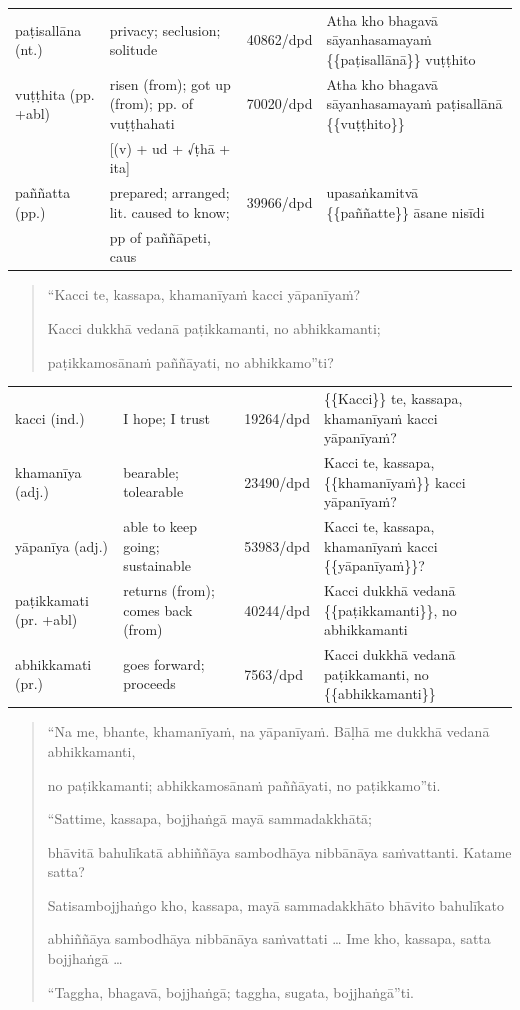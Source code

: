 \documentclass[11pt,oneside]{memoir}
\begin{document}
\begin{longtable}{L{\colOne} L{\colTwo} H H}
paṭisallāna (nt.) & privacy; seclusion; solitude & 40862/dpd & Atha kho bhagavā sāyanhasamayaṁ \{\{paṭisallānā\}\} vuṭṭhito\\[0pt]
vuṭṭhita (pp. +abl) & risen (from); got up (from); pp. of vuṭṭhahati & 70020/dpd & Atha kho bhagavā sāyanhasamayaṁ paṭisallānā \{\{vuṭṭhito\}\}\\[0pt]
 & [(v) + ud + √ṭhā + ita] &  & \\[0pt]
paññatta (pp.) & prepared; arranged; lit. caused to know; & 39966/dpd & upasaṅkamitvā \{\{paññatte\}\} āsane nisīdi\\[0pt]
 & pp of paññāpeti, caus &  & \\[0pt]
\end{longtable}

\begin{quote}
“Kacci te, kassapa, khamanīyaṁ kacci yāpanīyaṁ?

Kacci dukkhā vedanā paṭikkamanti, no abhikkamanti;

paṭikkamosānaṁ paññāyati, no abhikkamo”ti?
\end{quote}

\begin{longtable}{L{\colOne} L{\colTwo} H H}
kacci (ind.) & I hope; I trust & 19264/dpd & \{\{Kacci\}\} te, kassapa, khamanīyaṁ kacci yāpanīyaṁ?\\[0pt]
khamanīya (adj.) & bearable; tolearable & 23490/dpd & Kacci te, kassapa, \{\{khamanīyaṁ\}\} kacci yāpanīyaṁ?\\[0pt]
yāpanīya (adj.) & able to keep going; sustainable & 53983/dpd & Kacci te, kassapa, khamanīyaṁ kacci \{\{yāpanīyaṁ\}\}?\\[0pt]
paṭikkamati (pr. +abl) & returns (from); comes back (from) & 40244/dpd & Kacci dukkhā vedanā \{\{paṭikkamanti\}\}, no abhikkamanti\\[0pt]
abhikkamati (pr.) & goes forward; proceeds & 7563/dpd & Kacci dukkhā vedanā paṭikkamanti, no \{\{abhikkamanti\}\}\\[0pt]
\end{longtable}

\begin{quote}
“Na me, bhante, khamanīyaṁ, na yāpanīyaṁ. Bāḷhā me dukkhā vedanā abhikkamanti,

no paṭikkamanti; abhikkamosānaṁ paññāyati, no paṭikkamo”ti.

“Sattime, kassapa, bojjhaṅgā mayā sammadakkhātā;

bhāvitā bahulīkatā abhiññāya sambodhāya nibbānāya saṁvattanti. Katame satta?

Satisambojjhaṅgo kho, kassapa, mayā sammadakkhāto bhāvito bahulīkato

abhiññāya sambodhāya nibbānāya saṁvattati \ldots{} Ime kho, kassapa, satta bojjhaṅgā \ldots{}

“Taggha, bhagavā, bojjhaṅgā; taggha, sugata, bojjhaṅgā”ti.
\end{quote}
\end{document}

